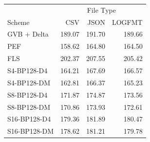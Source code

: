 \begin{tabular}{lrrr}
\toprule
 & \multicolumn{3}{c}{File Type} \\
Scheme & CSV & JSON & LOGFMT \\
\midrule
GVB + Delta & 189.07 & 191.70 & 189.66 \\
PEF & 158.62 & 164.80 & 164.50 \\
FLS & 202.37 & 207.55 & 205.42 \\
S4-BP128-D4 & 164.21 & 167.69 & 166.57 \\
S4-BP128-DM & 162.81 & 166.37 & 165.23 \\
S8-BP128-D4 & 171.87 & 174.87 & 173.56 \\
S8-BP128-DM & 170.86 & 173.93 & 172.61 \\
S16-BP128-D4 & 179.36 & 181.89 & 180.47 \\
S16-BP128-DM & 178.62 & 181.21 & 179.78 \\
\bottomrule
\end{tabular}
